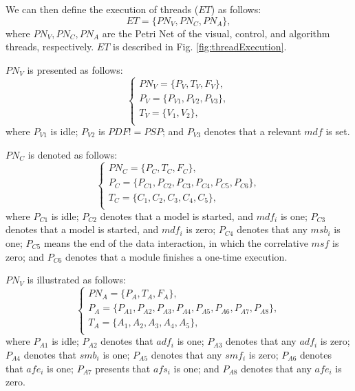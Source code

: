 \documentclass[journal,UTF8]{IEEEtran}
\begin{document}
	We can then define the execution of threads ($ET$) as follows:
	\begin{equation}
	ET = \{PN_V,PN_C,PN_A\},
	\end{equation} 
	where $PN_V,PN_C,PN_A$ are the Petri Net of the visual, control, and algorithm threads, respectively. $ET$ is described in Fig. \ref{fig:threadExecution}.
	
	$PN_V$ is presented as follows:
	\begin{equation}
	\left\{
	\begin{array}{l}
	PN_V= \{P_V,T_V,F_V\},\\
	P_V=\{P_{V1}, P_{V2}, P_{V3}\},\\
	T_V=\{V_1,V_2\},\\
	\end{array}
	\right.
	\end{equation} 
	where $P_{V1}$ is idle; $P_{V2}$ is $PDF != PSP$; and $P_{V3}$ denotes that a relevant $mdf$ is set.
	
	$PN_C$ is denoted as follows:
	\begin{equation}
	\left\{
	\begin{array}{l}
	PN_C= \{P_C,T_C,F_C\},\\
	P_C=\{P_{C1}, P_{C2}, P_{C3}, P_{C4}, P_{C5}, P_{C6}\},\\
	T_C=\{C_1,C_2,C_3,C_4,C_5\},\\
	\end{array}
	\right.
	\end{equation} 
	where $P_{C1}$ is idle; $P_{C2}$ denotes that a model is started, and $mdf_i$ is one; $P_{C3}$ denotes that a model is started, and $mdf_i$ is zero; $P_{C4}$ denotes that any $msb_i$ is one; $P_{C5}$ means the end of the data interaction, in which the  correlative $msf$ is zero; and $P_{C6}$ denotes that a module finishes a one-time execution.
	
	$PN_V$ is illustrated as follows:
	\begin{equation}
	\left\{
	\begin{array}{l}
	PN_A= \{P_A,T_A,F_A\},\\
	P_A=\{P_{A1}, P_{A2}, P_{A3}, P_{A4}, P_{A5}, P_{A6}, P_{A7}, P_{A8}\},\\
	T_A=\{A_1,A_2,A_3,A_4,A_5\},\\
	\end{array}
	\right.
	\end{equation} 
	where $P_{A1}$ is idle; $P_{A2}$ denotes that $adf_i$ is one; $P_{A3}$ denotes that any $adf_i$ is zero; $P_{A4}$ denotes that $smb_i$ is one; $P_{A5}$ denotes that any $smf_i$ is zero; $P_{A6}$ denotes that $afe_i$ is one; $P_{A7}$ presents that $afs_i$ is one; and $P_{A8}$ denotes that any $afe_i$ is zero.   
	
\end{document}

